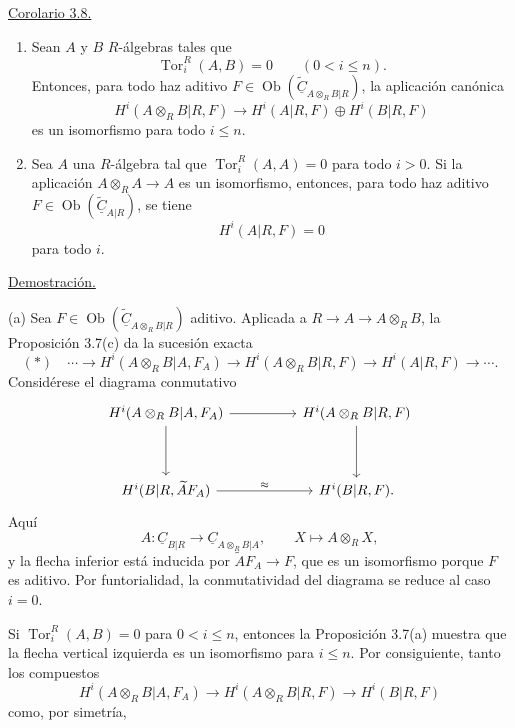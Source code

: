 
\underline{Corolario 3.8.}

\begin{enumerate}[label=(\alph*)]
\item Sean $A$ y $B$ $R$-álgebras tales que
\[
 \operatorname{Tor}_i^R(A,B)=0\qquad(0<i\leq n).
\]
Entonces, para todo haz aditivo
$F\in\operatorname{Ob}(\widetilde{\underline C}_{A\otimes_RB|R})$,
la aplicación canónica
\[
 H^i(A\otimes_RB|R,F)
 \longrightarrow H^i(A|R,F)\oplus H^i(B|R,F)
\]
es un isomorfismo para todo $i\leq n$.

\item Sea $A$ una $R$-álgebra tal que
$\operatorname{Tor}_i^R(A,A)=0$ para todo $i>0$. Si la aplicación
$A\otimes_RA\longrightarrow A$ es un isomorfismo, entonces, para todo
haz aditivo
$F\in\operatorname{Ob}(\widetilde{\underline C}_{A|R})$, se tiene
\[
 H^i(A|R,F)=0
\]
para todo $i$.
\end{enumerate}

\underline{Demostración.}

(a) Sea
$F\in\operatorname{Ob}(\widetilde{\underline C}_{A\otimes_RB|R})$
aditivo. Aplicada a
$R\longrightarrow A\longrightarrow A\otimes_RB$, la Proposición
3.7(c) da la sucesión exacta
\[
 (*)\quad\cdots\longrightarrow
 H^i(A\otimes_RB|A,F_A)
 \longrightarrow H^i(A\otimes_RB|R,F)
 \longrightarrow H^i(A|R,F)\longrightarrow\cdots.
\]
Considérese el diagrama conmutativo
\[
\begin{tikzcd}[column sep=huge,row sep=huge]
H^i(A\otimes_RB|A,F_A) \arrow[r] \arrow[d]
& H^i(A\otimes_RB|R,F) \arrow[d]\\
H^i(B|R,\widetilde A F_A) \arrow[r,"\approx"]
& H^i(B|R,F).
\end{tikzcd}
\]
Aquí
\[
 A:\underline C_{B|R}\longrightarrow
 \underline C_{A\otimes_RB|A},
 \qquad X\longmapsto A\otimes_RX,
\]
y la flecha inferior está inducida por
$\widetilde A F_A\longrightarrow F$, que es un isomorfismo porque $F$ es
aditivo. Por funtorialidad, la conmutatividad del diagrama se reduce al
caso $i=0$.

Si $\operatorname{Tor}_i^R(A,B)=0$ para $0<i\leq n$, entonces la
Proposición 3.7(a) muestra que la flecha vertical izquierda es un
isomorfismo para $i\leq n$. Por consiguiente, tanto los compuestos
\[
 H^i(A\otimes_RB|A,F_A)
 \longrightarrow H^i(A\otimes_RB|R,F)
 \longrightarrow H^i(B|R,F)
\]
como, por simetría,


